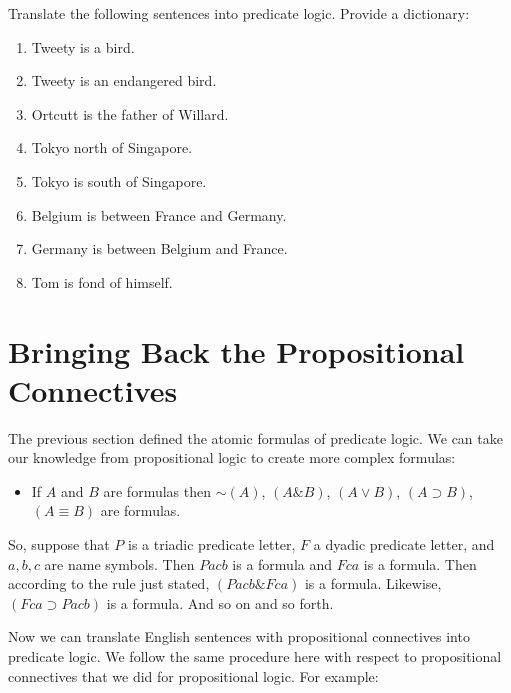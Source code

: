 \documentclass[
]{book}
\providecommand{\tightlist}{%
  \setlength{\itemsep}{0pt}\setlength{\parskip}{0pt}}
\begin{document}
Translate the following sentences into predicate logic. Provide a dictionary:

\begin{enumerate}
\def\labelenumi{\arabic{enumi}.}
\tightlist
\item
  Tweety is a bird.
\item
  Tweety is an endangered bird.
\item
  Ortcutt is the father of Willard.
\item
  Tokyo north of Singapore.
\item
  Tokyo is south of Singapore.
\item
  Belgium is between France and Germany.
\item
  Germany is between Belgium and France.
\item
  Tom is fond of himself.
\end{enumerate}

\hypertarget{bringing-back-the-propositional-connectives}{%
\section{Bringing Back the Propositional Connectives}\label{bringing-back-the-propositional-connectives}}

The previous section defined the atomic formulas of predicate logic. We can take our knowledge from propositional logic to create more complex formulas:

\begin{itemize}
\tightlist
\item
  If \(A\) and \(B\) are formulas then \(\sim(A)\), \((A \& B)\), \((A \lor B)\), \((A \supset B)\), \((A \equiv B)\) are formulas.
\end{itemize}

So, suppose that \(P\) is a triadic predicate letter, \(F\) a dyadic predicate letter, and \(a,b,c\) are name symbols. Then \(Pacb\) is a formula and \(Fca\) is a formula. Then according to the rule just stated, \((Pacb \& Fca)\) is a formula. Likewise, \((Fca \supset Pacb)\) is a formula. And so on and so forth.

Now we can translate English sentences with propositional connectives into predicate logic. We follow the same procedure here with respect to propositional connectives that we did for propositional logic. For example:
\end{document}
